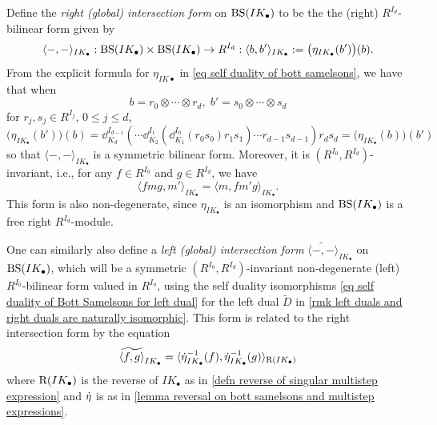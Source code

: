\begin{defn}\label{defn invariant pairing on singular Bott Samelsons}
    Define the \emph{right (global) intersection form} on $\operatorname{BS}(IK_\bullet)$ to be the the (right) $R^{I_d}$-bilinear form given by 
    \begin{equation}
       \langle -,-\rangle_{IK_\bullet}: \operatorname{BS}(IK_\bullet)\times \operatorname{BS}(IK_\bullet) \rightarrow R^{I_d}: \langle b,b'\rangle_{IK_\bullet} := \bigl(\eta_{IK_\bullet}(b')\bigr)(b).
    \end{equation}
    From the explicit formula for $\eta_{IK\bullet}$ in \cref{eq self duality of bott samelsons}, 
    we have that when 
    $$b= r_0 \otimes \cdots \otimes r_d,\; b'=s_0\otimes \cdots \otimes s_d$$
    for $r_j, s_j \in R^{I_j}$, $0\leq j \leq d$,
    \begin{equation}
        \bigl(\eta_{IK_\bullet}(b')\bigr)(b) =\dd^{I_{d-1}}_{K_d} \left(\cdots \dd^{I_1}_{K_2}(\dd^{I_0}_{K_1}(r_0s_0)r_1s_1) \cdots r_{d-1}s_{d-1} \right)r_ds_d= \bigl(\eta_{IK_\bullet}(b)\bigr)(b')
    \end{equation}
    so that $\langle-,-\rangle_{IK_\bullet}$ is a symmetric bilinear form. 
    Moreover, it is $(R^{I_0}, R^{I_d})$-invariant, i.e., for any $f\in R^{I_0}$ and $g \in R^{I_d}$, we have
    \begin{equation}
        \langle fmg,m' \rangle_{IK_\bullet}=\langle m, fm'g\rangle_{IK_\bullet}.
    \end{equation}
    This form is also non-degenerate, since $\eta_{IK_\bullet}$ is an isomorphism and $\operatorname{BS}(IK_\bullet)$ is a free right $R^{I_d}$-module.
\end{defn}

\begin{remark}\label{rmk left intersection form}
    One can similarly also define a \emph{left (global) intersection form} $\widetilde{\langle -, -\rangle}_{IK_\bullet}$ on $\operatorname{BS}(IK_\bullet)$, which will be a symmetric $(R^{I_0},R^{I_d})$-invariant non-degenerate (left) $R^{I_0}$-bilinear form valued in $R^{I_0}$, using the self duality isomorphisms \cref{eq self duality of Bott Samelsons for left dual} for the left dual $\widetilde{D}$ in \cref{rmk left duals and right duals are naturally isomorphic}. 
    This form is related to the right intersection form by the equation
    \begin{equation}
        \widetilde{\langle f, g \rangle}_{IK_\bullet}= \langle \dot{\eta}_{IK_\bullet}^{-1}(f), \dot{\eta}_{IK_\bullet}^{-1}(g)\rangle_{\mathrm{R} (IK_\bullet)}
    \end{equation}
    where $\mathrm{R}(IK_\bullet)$ is the reverse of $IK_\bullet$ as in \cref{defn reverse of singular multistep expression} and $\dot{\eta}$ is as in \cref{lemma reversal on bott samelsons and multistep expressions}.
\end{remark}

